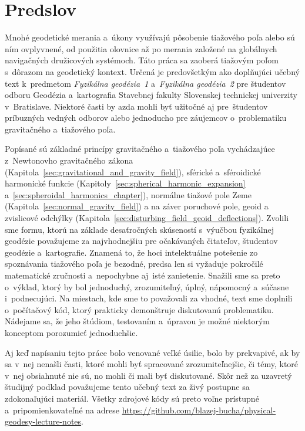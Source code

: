 \documentclass[a4paper,12pt]{book}
\begin{document}

\chapter*{Predslov}

Mnohé geodetické merania a~úkony využívajú pôsobenie tiažového poľa alebo sú 
ním ovplyvnené, od použitia olovnice až po merania založené na globálnych 
navigačných družicových systémoch.  Táto práca sa zaoberá tiažovým poľom 
s~dôrazom na geodetický kontext.  Určená je predovšetkým ako doplňujúci učebný 
text k~predmetom \emph{Fyzikálna geodézia~1} a~\emph{Fyzikálna geodézia~2} pre 
študentov odboru Geodézia a~kartografia Stavebnej fakulty Slovenskej technickej 
univerzity v~Bratislave.  Niektoré časti by azda mohli byť užitočné aj 
pre~študentov príbuzných vedných odborov alebo jednoducho pre záujemcov 
o~problematiku gravitačného a~tiažového poľa.

Popísané sú základné princípy gravitačného a~tiažového poľa vychádzajúce 
z~Newtonovho gravitačného zákona 
(Kapitola~\ref{sec:gravitational_and_gravity_field}), sférické a~sféroidické 
harmonické funkcie (Kapitoly~\ref{sec:spherical_harmonic_expansion} 
a~\ref{sec:spheroidal_harmonics_chapter}), normálne tiažové pole Zeme 
(Kapitola~\ref{sec:normal_gravity_field}) a na záver poruchové pole, geoid 
a zvislicové odchýlky (Kapitola~\ref{sec:disturbing_field_geoid_deflections}).  
Zvolili sme formu, ktorú na základe desaťročných skúseností s~výučbou 
fyzikálnej geodézie považujeme za najvhodnejšiu pre očakávaných čitateľov, 
študentov geodézie a~kartografie.  Znamená to, že hoci intelektuálne potešenie 
zo spoznávania tiažového poľa je bezodné, predsa len si vyžaduje pokročilé 
matematické zručnosti a~nepochybne aj~isté zanietenie.  Snažili sme sa preto 
o~výklad, ktorý by bol jednoduchý, zrozumiteľný, úplný, nápomocný a~súčasne 
i~podnecujúci.  Na miestach, kde sme to považovali za vhodné, text sme doplnili 
o~počítačový kód, ktorý prakticky demonštruje diskutovanú problematiku.  
Nádejame sa, že jeho štúdiom, testovaním a~úpravou je možné niektorým konceptom 
porozumieť jednoduchšie.

Aj keď napísaniu tejto práce bolo venované veľké úsilie, bolo by prekvapivé, ak 
by sa v~nej nenašli časti, ktoré mohli byť spracované zrozumiteľnejšie, či 
témy, ktoré v~nej obsiahnuté nie sú, no mohli či mali byť diskutované.  Skôr 
než za uzavretý študijný podklad považujeme tento učebný text za živý postupne 
sa zdokonaľujúci materiál.  Všetky zdrojové kódy sú preto voľne prístupné 
a~pripomienkovateľné na adrese 
\url{https://github.com/blazej-bucha/physical-geodesy-lecture-notes}.
\end{document}
